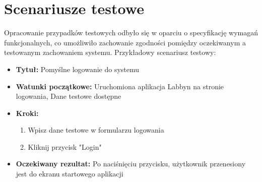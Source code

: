 \section{Scenariusze testowe}
\par
Opracowanie przypadków testowych odbyło się w oparciu o specyfikację wymagań funkcjonalnych, co umożliwiło zachowanie zgodności pomiędzy oczekiwanym a testowanym zachowaniem systemu.
Przykładowy scenariusz testowy:
\begin{itemize}
    \item \textbf{Tytuł:} Pomyślne logowanie do systemu
    \item \textbf{Watunki początkowe:} Uruchomiona aplikacja Labbyn na stronie logowania, Dane testowe dostępne
    \item \textbf{Kroki:} 
    \begin{enumerate}
        \item Wpisz dane testowe w formularzu logowania
        \item Kliknij przycisk "Login"
    \end{enumerate}
    \item \textbf{Oczekiwany rezultat:} Po naciśnięciu przycisku, użytkownik przenesiony jest do ekranu startowego aplikacji
\end{itemize}


